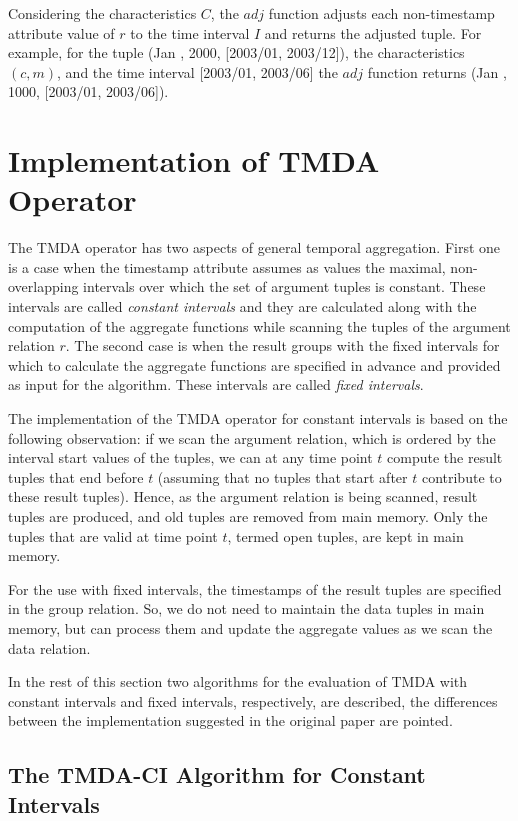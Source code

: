 \documentclass[a4paper,11pt]{article}
\begin{document}
Considering the characteristics $C$, the $adj$ function adjusts each non-timestamp attribute value of $r$ to the time interval $I$ and returns the adjusted tuple. For example, for the tuple (Jan , 2000, [2003/01, 2003/12]), the characteristics $(c, m)$, and the time interval [2003/01, 2003/06] the $adj$ function returns (Jan , 1000, [2003/01, 2003/06]).

\section{Implementation of TMDA Operator}

The TMDA operator has two aspects of general temporal aggregation. First one is a case when the timestamp attribute assumes as values the maximal, non-overlapping intervals over which the set of argument tuples is constant. These intervals are called \textit{constant intervals} and they are calculated along with the computation of the aggregate functions while scanning the tuples of the argument relation $r$. The second case is when the result groups with the fixed intervals for which to calculate the aggregate functions are specified in advance and provided as input for the algorithm. These intervals are called \textit{fixed intervals}. 

The implementation of the TMDA operator for constant intervals is based on the following observation: if we scan the argument relation, which is ordered by the interval start values of the tuples, we can at any time point $t$ compute the result tuples that end before $t$ (assuming that no tuples that start after $t$ contribute to these result tuples). Hence, as the argument relation is being scanned, result tuples are produced, and old tuples are removed from main memory. Only the tuples that are valid at time point $t$, termed open tuples, are kept in main memory.

For the use with fixed intervals, the timestamps of the result tuples are specified in the group relation. So, we do not need to maintain the data tuples in main memory, but can process them and update the aggregate values as we scan the data relation.

In the rest of this section two algorithms for the evaluation of TMDA with constant intervals and fixed intervals, respectively, are described, the differences between the implementation suggested in the original paper are pointed.

\subsection{The TMDA-CI Algorithm for Constant Intervals}
\end{document}

